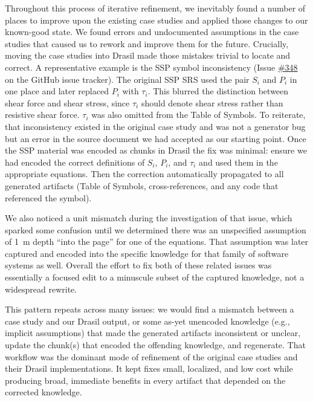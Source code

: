 Throughout this process of iterative refinement, we inevitably found a number 
of places to improve upon the existing case studies and applied those changes 
to our known-good state. We found errors and undocumented assumptions in the 
case studies that caused us to rework and improve them for the future. 
Crucially, moving the case studies into Drasil made those mistakes trivial to 
locate and correct. A representative example is the SSP symbol inconsistency 
(Issue \href{https://github.com/JacquesCarette/Drasil/issues/348}{\#348} on the 
GitHub issue tracker). The original SSP SRS used the pair $S_i$ and $P_i$ in 
one place and later replaced $P_i$ with $\tau_i$. This blurred the distinction 
between shear force and shear stress, since $\tau_i$ should denote shear stress
rather than resistive shear force. $\tau_i$ was also omitted from the Table of 
Symbols. To reiterate, that inconsistency existed in the original case study 
and was not a generator bug but an error in the source document we had accepted 
as our starting point. Once the SSP material was encoded as chunks in Drasil 
the fix was minimal: ensure we had encoded the correct definitions of $S_i$, 
$P_i$, and $\tau_i$ and used them in the appropriate equations. Then the 
correction automatically propagated to all generated artifacts (Table of 
Symbols, cross-references, and any code that referenced the symbol).

We also noticed a unit mismatch during the investigation of that issue, which 
sparked some confusion until we determined there was an unspecified assumption 
of 1~m depth ``into the page'' for one of the equations. That assumption was
later captured and encoded into the specific knowledge for that family of 
software systems as well. Overall the effort to fix both of these related 
issues was essentially a focused edit to a minuscule subset of the captured 
knowledge, not a widespread rewrite.

This pattern repeats across many issues: we would find a mismatch between a
case study and our Drasil output, or some as-yet unencoded knowledge (e.g.,
implicit assumptions) that made the generated artifacts inconsistent or 
unclear, update the chunk(s) that encoded the offending knowledge, and 
regenerate. That workflow was the dominant mode of refinement of the original
case studies and their Drasil implementations. It kept fixes small, localized, 
and low cost while producing broad, immediate benefits in every artifact that 
depended on the corrected knowledge.

